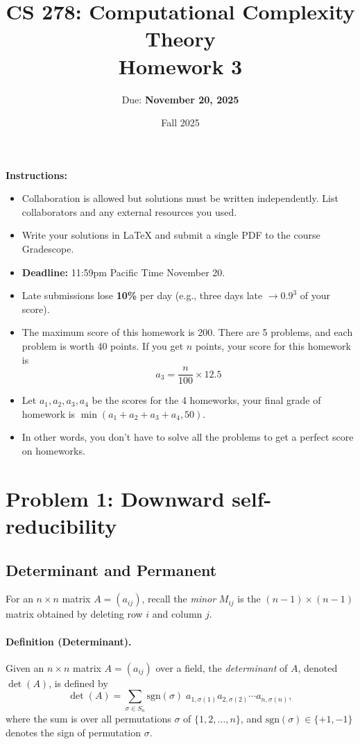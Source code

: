 \documentclass[12pt]{article}
\title{CS 278: Computational Complexity Theory\\
       Homework 3}
\author{Due: \textbf{November 20, 2025}}
\date{Fall 2025}
\begin{document}
\maketitle


\begin{center}
\textbf{Instructions:}
\end{center}

\begin{itemize}
    \item Collaboration is allowed but solutions must be written independently. List collaborators and any external resources you used.
    \item Write your solutions in \LaTeX\xspace and submit a single PDF to the course Gradescope.
    \item \textbf{Deadline:} 11:59pm Pacific Time November 20.
    \item Late submissions lose \textbf{10\%} per day (e.g., three days late $\rightarrow 0.9^3$ of your score).
    \item The maximum score of this homework is 200. There are 5 problems, and each problem is worth 40 points. If you get $n$ points, your score for this homework is $$a_3 = \frac{n}{100} \times 12.5$$
    
    \item Let $a_1, a_2, a_3, a_4$ be the scores for the 4 homeworks, your final grade of homework is $\min(a_1 + a_2 + a_3 + a_4, 50)$.
    
    \item In other words, you don't have to solve all the problems to get a perfect score on homeworks.
\end{itemize}

\newpage


\section{Problem 1: Downward self-reducibility}

\subsection{Determinant and Permanent}

For an $n\times n$ matrix $A=(a_{ij})$, recall the \emph{minor} $M_{ij}$ is the $(n-1)\times(n-1)$ matrix obtained by deleting row $i$ and column $j$.

\paragraph{Definition (Determinant).} 
Given an $n \times n$ matrix $A = (a_{ij})$ over a field, the \emph{determinant} of $A$, denoted $\det(A)$, is defined by
\[
    \det(A) = \sum_{\sigma \in S_n} \mathrm{sgn}(\sigma)\; a_{1,\sigma(1)} a_{2,\sigma(2)} \cdots a_{n, \sigma(n)},
\]
where the sum is over all permutations $\sigma$ of $\{1,2,\ldots,n\}$, and $\mathrm{sgn}(\sigma) \in \{+1,-1\}$ denotes the sign of permutation $\sigma$.
\end{document}
